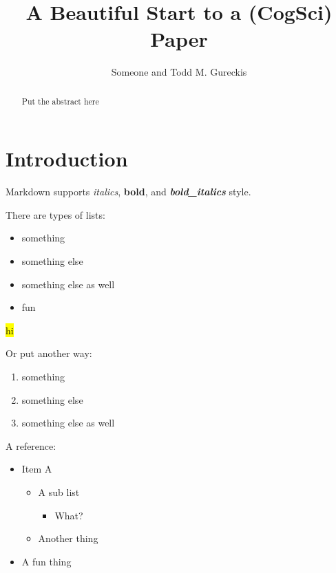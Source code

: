 \documentclass[
]{article}
\title{A Beautiful Start to a (CogSci) Paper}
\author{Someone and Todd M. Gureckis}
\date{}
\providecommand{\tightlist}{%
  \setlength{\itemsep}{0pt}\setlength{\parskip}{0pt}}
\begin{document}
\maketitle
\begin{abstract}
Put the abstract here
\end{abstract}

\hypertarget{introduction}{%
\section{Introduction}\label{introduction}}

Markdown supports \emph{italics}, \textbf{bold}, and
\textbf{\emph{bold\_italics}} style.

There are types of lists:

\begin{itemize}
\tightlist
\item
  something\\
\item
  something else\\
\item
  something else as well\\
\item
  fun
\end{itemize}

\citep{Gureckis2006} \citep{Chapman1967}

\hl{hi}

Or put another way:

\begin{enumerate}
\def\labelenumi{\arabic{enumi}.}
\tightlist
\item
  something\\
\item
  something else\\
\item
  something else as well
\end{enumerate}

A reference: \citep{Love2007}

\begin{itemize}
\tightlist
\item
  Item A

  \begin{itemize}
  \tightlist
  \item
    A sub list

    \begin{itemize}
    \tightlist
    \item
      What?
    \end{itemize}
  \item
    Another thing
  \end{itemize}
\item
  A fun thing
\end{itemize}
\end{document}
